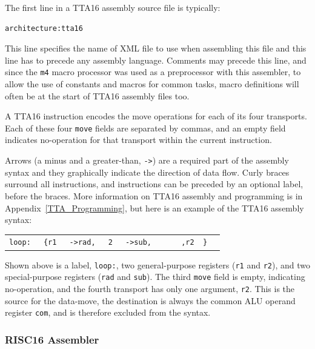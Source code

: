\noindent The first line in a TTA16 assembly source file is typically:
\begin{center}
\begin{minipage}{0.5\linewidth}
\begin{verbatim}
architecture:tta16
\end{verbatim}
\end{minipage}
\end{center}

This line specifies the name of XML file to use when assembling this file and
this line has to precede any assembly language. Comments may precede this line,
and since the \texttt{m4} macro processor was used as a preprocessor with this
assembler, to allow the use of constants and macros for common tasks, macro
definitions will often be at the start of TTA16 assembly files too.

A TTA16 instruction encodes the move operations for each of its four transports.
Each of these four \texttt{move} fields are separated by commas, and an empty
field indicates no-operation for that transport within the current instruction.

Arrows (a minus and a greater-than, \texttt{->}) are a required part of the
assembly syntax and they graphically indicate the direction of data flow. Curly
braces surround all instructions, and instructions can be preceded by an optional
label, before the braces. More information on TTA16 assembly and programming is
in Appendix~\ref{TTA_Programming}, but here is an example of the TTA16 assembly
syntax:
\begin{center}
\begin{tabular}{l l l l l l l l l}
\tt loop: & \tt \{r1 & \tt ->rad, & \tt 2 & \tt ->sub, & & & \tt ,r2 \tt
\}
\end{tabular}
\end{center}
Shown above is a label, \texttt{loop:}, two general-purpose registers
(\texttt{r1} and \texttt{r2}), and two special-purpose registers
(\texttt{rad} and \texttt{sub}). The third \texttt{move} field is empty,
indicating no-operation, and the fourth transport has only one argument,
\texttt{r2}. This is the source for the data-move, the destination is always the
common ALU operand register \texttt{com}, and is therefore excluded from the
syntax.


\subsubsection{RISC16 Assembler}

